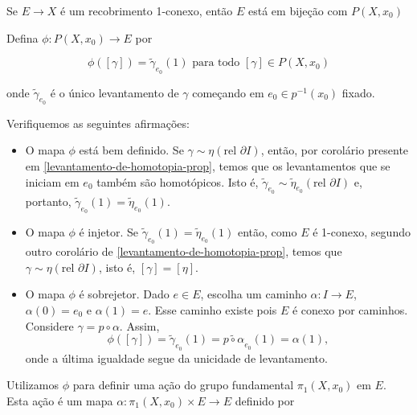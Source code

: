 \begin{prop}%
	Se $E\rightarrow X$ é um recobrimento 1-conexo, então $E$ está em bijeção com $P(X,x_0)$
\end{prop}
\begin{dem}
    Defina $\phi: P(X, x_0)\rightarrow E$ por

    $$\phi([\gamma])=\tilde{\gamma}_{e_0}(1)\text{ para todo }[\gamma]\in P(X,x_0)$$

    onde $\tilde{\gamma}_{e_0}$ é o único levantamento de $\gamma$ começando em $e_0\in p^{-1}(x_0)$ fixado.

    Verifiquemos as seguintes afirmações:

    \begin{itemize}
        \item O mapa $\phi$ está bem definido.\newline
            Se $\gamma\sim \eta (\text{rel }\partial I)$, então, por corolário presente em \ref{levantamento-de-homotopia-prop}, temos que os levantamentos que se iniciam em $e_0$ também são homotópicos. Isto é, $\tilde{\gamma}_{e_0}\sim\tilde{\eta}_{e_0}(\text{rel }\partial I)$ e, portanto, $\tilde{\gamma}_{e_0}(1)=\tilde{\eta}_{e_0}(1)$.\newline
        
        \item O mapa $\phi$ é injetor.\newline
            Se $\tilde{\gamma}_{e_0}(1)=\tilde{\eta}_{e_0}(1)$ então, como $E$ é 1-conexo, segundo outro corolário de \ref{levantamento-de-homotopia-prop}, temos que $\gamma\sim \eta (\text{rel }\partial I)$, isto é, $[\gamma]=[\eta]$.\newline
            
        \item O mapa $\phi$ é sobrejetor.\newline
            Dado $e\in E$, escolha um caminho $\alpha:I\rightarrow E$, $\alpha(0)=e_0$ e $\alpha(1)=e$. Esse caminho existe pois $E$ é conexo por caminhos. Considere $\gamma=p\circ \alpha$. Assim, $$\phi([\gamma])=\tilde{\gamma}_{e_0}(1)=\widetilde{p\circ \alpha}_{e_0}(1)=\alpha(1),$$ onde a última igualdade segue da unicidade de levantamento.
    \end{itemize}
\end{dem}

Utilizamos $\phi$ para definir uma ação do grupo fundamental $\pi_1(X,x_0)$ em $E$. Esta ação é um mapa $\alpha: \pi_1(X,x_0)\times E\rightarrow E$ definido por

